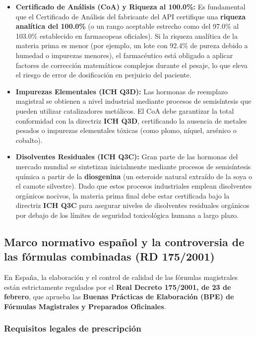 \documentclass[
  spanish,
]{article}
\begin{document}
\begin{itemize}
\item
  \textbf{Certificado de Análisis (CoA) y Riqueza al 100.0\%:} Es fundamental que el Certificado de Análisis del fabricante del API certifique una \textbf{riqueza analítica del 100.0\%} (o un rango aceptable estrecho como del 97.0\% al 103.0\% establecido en farmacopeas oficiales). Si la riqueza analítica de la materia prima es menor (por ejemplo, un lote con 92.4\% de pureza debido a humedad o impurezas menores), el farmacéutico está obligado a aplicar factores de corrección matemáticos complejos durante el pesaje, lo que eleva el riesgo de error de dosificación en perjuicio del paciente.
\item
  \textbf{Impurezas Elementales (ICH Q3D):} Las hormonas de reemplazo magistral se obtienen a nivel industrial mediante procesos de semisíntesis que pueden utilizar catalizadores metálicos. El CoA debe garantizar la total conformidad con la directriz \textbf{ICH Q3D}, certificando la ausencia de metales pesados o impurezas elementales tóxicas (como plomo, níquel, arsénico o cobalto).
\item
  \textbf{Disolventes Residuales (ICH Q3C):} Gran parte de las hormonas del mercado mundial se sintetizan inicialmente mediante procesos de semisíntesis química a partir de la \textbf{diosgenina} (un esteroide natural extraído de la soya o el camote silvestre). Dado que estos procesos industriales emplean disolventes orgánicos nocivos, la materia prima final debe estar certificada bajo la directriz \textbf{ICH Q3C} para asegurar niveles de disolventes residuales orgánicos por debajo de los límites de seguridad toxicológica humana a largo plazo.
\end{itemize}

\subsection{Marco normativo español y la controversia de las fórmulas combinadas (RD 175/2001)}\label{marco-normativo-espauxf1ol-y-la-controversia-de-las-fuxf3rmulas-combinadas-rd-1752001}

En España, la elaboración y el control de calidad de las fórmulas magistrales están estrictamente regulados por el \textbf{Real Decreto 175/2001, de 23 de febrero}, que aprueba las \textbf{Buenas Prácticas de Elaboración (BPE) de Fórmulas Magistrales y Preparados Oficinales}.

\subsubsection{Requisitos legales de prescripción}\label{requisitos-legales-de-prescripciuxf3n}
\end{document}
